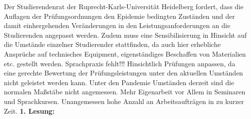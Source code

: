    {
        Der Studierendenrat der Ruprecht-Karls-Universität Heidelberg fordert, dass die
        Auflagen der Prüfungsordnungen den Epidemie bedingten Zuständen und der damit
        einhergehenden Veränderungen in den Leistungsanforderungen an die Studierenden
        angepasst werden. Zudem muss eine Sensibilisierung in Hinsicht auf die Umstände
        einzelner Studierender stattfinden, da auch hier erhebliche Ansprüche auf technisches
        Equipment, eigenständiges Beschaffen von Materialien etc. gestellt werden.
        Sprachpraxis fehlt!!! Hinsichtlich Prüfungen anpassen, da eine gerechte Bewertung der
        Prüfungsleistungen unter den aktuellen Umständen nicht geleistet werden kann. Unter
        den Pandemie Umständen derzeit sind die normalen Maßstäbe nicht angemessen.
        Mehr Eigenarbeit vor Allem in Seminaren und Sprachkursen. Unangemessen hohe
        Anzahl an Arbeitsaufträgen in zu kurzer Zeit.
    }{
    }{
        \textbf{1. Lesung:}
        \ul{}
    }{
    }
